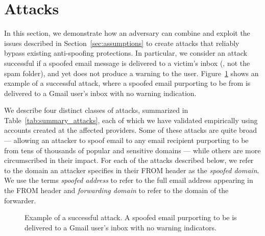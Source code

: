 
%
%

\section{Attacks}
\label{sec:attacks}
In this section, we demonstrate how an adversary can combine and
exploit the issues
described in Section~\ref{sec:assumptions} to create attacks that reliably
bypass existing anti-spoofing protections.  In particular, we consider an
attack successful if a spoofed email message is delivered to a
victim's inbox (\ie,  not the spam folder), and yet does not produce a
warning to the user.
Figure~\ref{fig:open_forwarding_attack_screenshot} shows
an example of a successful attack, where a spoofed
email purporting to be from  is delivered to a
Gmail user's inbox with no warning indication.

We describe four distinct classes of attacks, summarized in
Table~\ref{tab:summary_attacks}, each of which we have validated
empirically using accounts created at the affected providers.  Some of
these attacks are quite broad --- allowing an attacker to spoof email
to any email recipient purporting to be from tens of thousands of
popular and sensitive domains --- while others are more circumscribed
in their impact.
%
For each of the attacks described below, we refer to the domain an
attacker specifies in their \textsc{FROM} header as the
\textit{spoofed domain}.  We use the terms \textit{spoofed address} to
refer to the full email address appearing in the \textsc{FROM} header
and \textit{forwarding domain} to refer to the domain of the
forwarder.

\begin{figure}[t]
  \centering
{
    \setlength{\fboxsep}{0pt}
    \setlength{\fboxrule}{0.5pt}
}
  \caption{Example of a successful attack. A spoofed email purporting to be  is delivered to a Gmail user's inbox with no warning indicators.
}
\label{fig:open_forwarding_attack_screenshot}
\end{figure}


